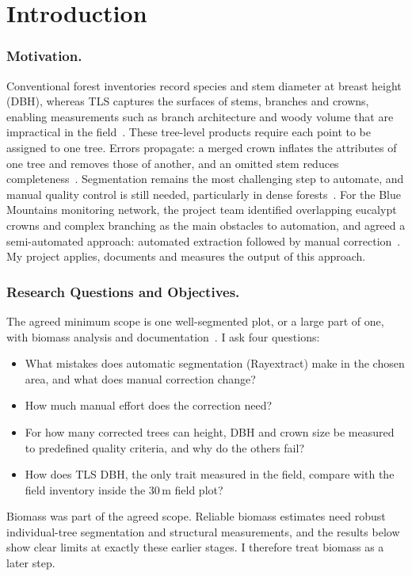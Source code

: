 \documentclass[runningheads]{llncs}
\begin{document}
\section{Introduction}\label{sec:intro}

\subsubsection{Motivation.}
Conventional forest inventories record species and stem diameter at breast height (DBH), whereas TLS captures the surfaces of stems, branches and crowns, enabling measurements such as branch architecture and woody volume that are impractical in the field~\cite{calders2020}. These tree-level products require each point to be assigned to one tree. Errors propagate: a merged crown inflates the attributes of one tree and removes those of another, and an omitted stem reduces completeness~\cite{calders2020,cherlet2026}. Segmentation remains the most challenging step to automate, and manual quality control is still needed, particularly in dense forests~\cite{cherlet2026,cushman2026}. For the Blue Mountains monitoring network, the project team identified overlapping eucalypt crowns and complex branching as the main obstacles to automation, and agreed a semi-automated approach: automated extraction followed by manual correction~\cite{meetingnotes,pipeline}. My project applies, documents and measures the output of this approach.

\subsubsection{Research Questions and Objectives.}
The agreed minimum scope is one well-segmented plot, or a large part of one, with biomass analysis and documentation~\cite{meetingnotes}. I ask four questions:
\begin{itemize}
\item[\textbf{RQ1}] What mistakes does automatic segmentation (Rayextract) make in the chosen area, and what does manual correction change?
\item[\textbf{RQ2}] How much manual effort does the correction need?
\item[\textbf{RQ3}] For how many corrected trees can height, DBH and crown size be measured to predefined quality criteria, and why do the others fail?
\item[\textbf{RQ4}] How does TLS DBH, the only trait measured in the field, compare with the field inventory inside the 30\,m field plot?
\end{itemize}
Biomass was part of the agreed scope. Reliable biomass estimates need robust individual-tree segmentation and structural measurements, and the results below show clear limits at exactly these earlier stages. I therefore treat biomass as a later step.
\end{document}
